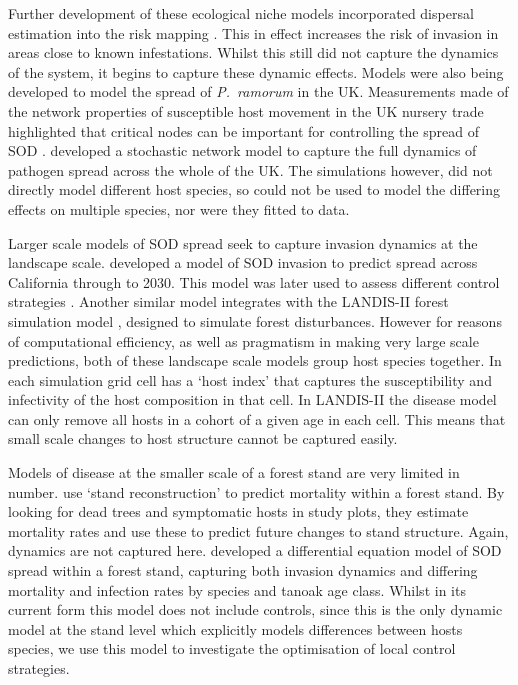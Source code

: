 Further development of these ecological niche models incorporated dispersal estimation into the risk mapping \citep{meentemeyer_early_2008}. This in effect increases the risk of invasion in areas close to known infestations. Whilst this still did not capture the dynamics of the system, it begins to capture these dynamic effects. Models were also being developed to model the spread of \emph{P.~ramorum} in the UK\@. Measurements  made of the network properties of susceptible host movement in the UK nursery trade highlighted that critical nodes can be important  for controlling the spread of SOD \citep{pautasso_epidemiological_2008, jeger_modelling_2007}. \citet{harwood_epidemiological_2009} developed a stochastic network model to capture the full dynamics of pathogen spread across the whole of the UK. The simulations however, did not directly model different host species, so could not be used to model the differing effects on multiple species, nor were they fitted to data.

Larger scale models of SOD spread seek to capture invasion dynamics at the landscape scale. \citet{meentemeyer_epidemiological_2011} developed a model of SOD invasion to predict spread across California through to 2030. This model was later used to assess different control strategies \citep{cunniffe_modelling_2016}. Another similar model \citep{tonini_modeling_2018} integrates with the LANDIS-II forest simulation model \citep{scheller_design_2007}, designed to simulate forest disturbances. However for reasons of computational efficiency, as well as pragmatism in making very large scale predictions, both of these landscape scale models group host species together. In \citet{meentemeyer_early_2008} each simulation grid cell has a `host index' that captures the susceptibility and infectivity of the host composition in that cell.  In LANDIS-II the disease model can only remove all hosts in a cohort of a given age in each cell. This means that small scale changes to host structure cannot be captured easily.

Models of disease at the smaller scale of a forest stand are very limited in number. \citet{brown_forest_2009} use `stand reconstruction' to predict mortality within a forest stand. By looking for dead trees and symptomatic hosts in study plots, they estimate mortality rates and use these to predict future changes to stand structure. Again, dynamics are not captured here. \citet{cobb_ecosystem_2012} developed a differential equation model of SOD spread within a forest stand, capturing both invasion dynamics and differing mortality and infection rates by species and tanoak age class. Whilst in its current form this model does not include controls, since this is the only dynamic model at the stand level which explicitly models differences between hosts species, we use this model to investigate the optimisation of local control strategies.

